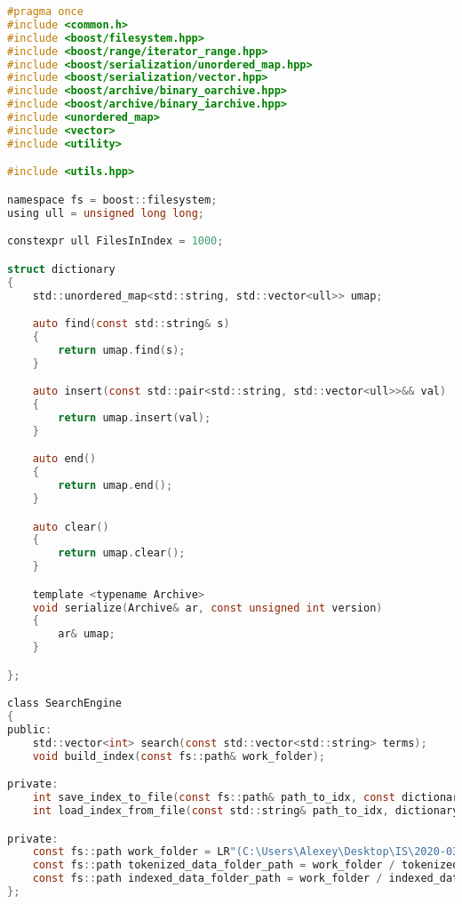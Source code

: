 \begin{lstlisting}[language=C]
#pragma once
#include <common.h>
#include <boost/filesystem.hpp>
#include <boost/range/iterator_range.hpp>
#include <boost/serialization/unordered_map.hpp>
#include <boost/serialization/vector.hpp>
#include <boost/archive/binary_oarchive.hpp> 
#include <boost/archive/binary_iarchive.hpp> 
#include <unordered_map>
#include <vector>
#include <utility>

#include <utils.hpp>

namespace fs = boost::filesystem;
using ull = unsigned long long;

constexpr ull FilesInIndex = 1000;

struct dictionary
{
	std::unordered_map<std::string, std::vector<ull>> umap;

	auto find(const std::string& s)
	{
		return umap.find(s);
	}

	auto insert(const std::pair<std::string, std::vector<ull>>&& val)
	{
		return umap.insert(val);
	}

	auto end()
	{
		return umap.end();
	}

	auto clear()
	{
		return umap.clear();
	}

	template <typename Archive>
	void serialize(Archive& ar, const unsigned int version)
	{
		ar& umap;
	}

};

class SearchEngine
{
public:
	std::vector<int> search(const std::vector<std::string> terms);
	void build_index(const fs::path& work_folder);

private:
	int save_index_to_file(const fs::path& path_to_idx, const dictionary& dict);
	int load_index_from_file(const std::string& path_to_idx, dictionary& dict);

private:
	const fs::path work_folder = LR"(C:\Users\Alexey\Desktop\IS\2020-03-13)";
	const fs::path tokenized_data_folder_path = work_folder / tokenized_data_folder;
	const fs::path indexed_data_folder_path = work_folder / indexed_data_folder;
};
\end{lstlisting}


\pagebreak

